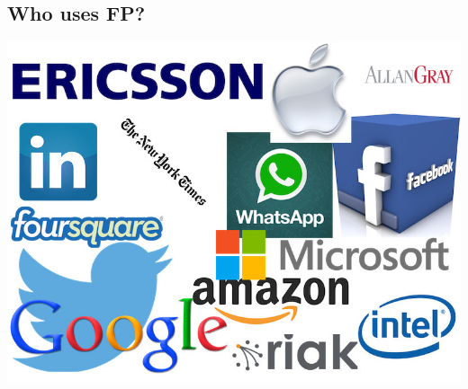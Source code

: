 \documentclass[mathserif]{beamer}
\begin{document}
\subsection{Who uses FP?}

\begin{frame}
  \begin{center}
    \includegraphics[scale=0.3]{img/cufp.jpg}
  \end{center}
\end{frame}
\end{document}

